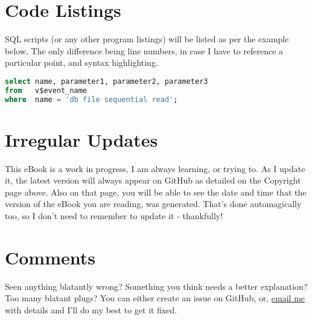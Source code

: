 \section*{Code Listings}

SQL scripts (or any other program listings) will be listed as per the example below. The only difference being line numbers, in case I have to reference a particular point, and syntax highlighting.

\begin{lstlisting}[language=SQL]
select name, parameter1, parameter2, parameter3
from   v$event_name
where  name = 'db file sequential read';
\end{lstlisting}

\section*{Irregular Updates}

This eBook is a work in progress, I am always learning, or trying to. As I update it, the latest version will always appear on GitHub as detailed on the Copyright page above. Also on that page, you will be able to see the date and time that the version of the eBook you are reading, was generated. That's done automagically too, so I don't need to remember to update it - thankfully!

\section*{Comments}

Seen anything blatantly wrong? Something  you think needs a better explanation? Too many blatant plugs? You can either create an issue on GitHub, or, \href{mailto://norman@dunbar-it.co.uk}{email me} with details and I'll do my best to get it fixed.